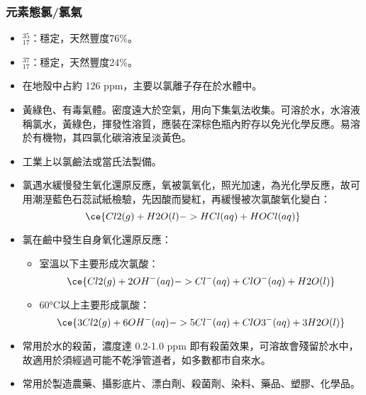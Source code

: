 \documentclass[a4paper,12pt]{report}
\begin{document}
\subsubsection{元素態氯/氯氣}
\begin{itemize}
\item $^{35}_{17}$\rmCl：穩定，天然豐度76\%。
\item $^{37}_{17}$\rmCl：穩定，天然豐度24\%。
\item 在地殼中占約 126 ppm，主要以氯離子存在於水體中。
\item 黃綠色、有毒氣體。密度遠大於空氣，用向下集氣法收集。可溶於水，水溶液稱氯水，黃綠色，揮發性溶質，應裝在深棕色瓶內貯存以免光化學反應。易溶於有機物，其四氯化碳溶液呈淡黃色。
\item 工業上以氯鹼法或當氏法製備。
\item 氯遇水緩慢發生氧化還原反應，氧被氯氧化，照光加速，為光化學反應，故可用潮溼藍色石蕊試紙檢驗，先因酸而變紅，再緩慢被次氯酸氧化變白：
\[\ce{Cl2(g) + H2O(l) -> HCl(aq) + HOCl(aq)}\]
\item 氯在鹼中發生自身氧化還原反應：
\begin{itemize}
\item 室溫以下主要形成次氯酸：
\[\ce{Cl2(g) + 2OH^-(aq) -> Cl^-(aq) + ClO^-(aq) + H2O(l)}\]
\item 60°C以上主要形成氯酸：
\[\ce{3Cl2(g) + 6OH^-(aq) -> 5Cl^-(aq) + ClO3^-(aq) + 3H2O(l)}\]
\end{itemize}
\item 常用於水的殺菌，濃度達 0.2-1.0 ppm 即有殺菌效果，可溶故會殘留於水中，故適用於須經過可能不乾淨管道者，如多數都市自來水。
\item 常用於製造農藥、攝影底片、漂白劑、殺菌劑、染料、藥品、塑膠、化學品。
\end{itemize}
\end{document}
